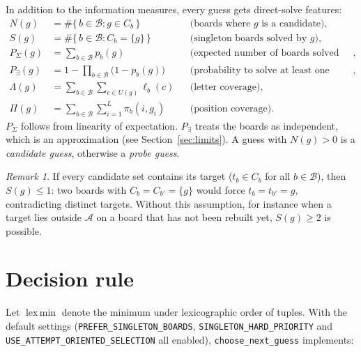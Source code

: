 \documentclass[11pt,a4paper]{article}
\theoremstyle{definition}
\theoremstyle{remark}
\newtheorem*{remark}{Remark}
\newcommand{\A}{\mathcal{A}}
\newcommand{\B}{\mathcal{B}}
\DeclareMathOperator*{\lexmin}{lex\,min}
\begin{document}
In addition to the information measures, every guess gets direct-solve features:
\begin{align*}
  N(g)     &= \#\{\, b \in \B : g \in C_b \,\}
            && \text{(boards where } g \text{ is a candidate)},\\
  S(g)     &= \#\{\, b \in \B : C_b = \{g\} \,\}
            && \text{(singleton boards solved by } g\text{)},\\
  P_{\Sigma}(g) &= \sum_{b \in \B} p_b(g)
            && \text{(expected number of boards solved directly)},\\
  P_{\exists}(g) &= 1 - \prod_{b \in \B} \bigl(1 - p_b(g)\bigr)
            && \text{(probability to solve at least one board)},\\
  \Lambda(g) &= \sum_{b \in \B} \sum_{c \in U(g)} \ell_b(c)
            && \text{(letter coverage)},\\
  \Pi(g)    &= \sum_{b \in \B} \sum_{i=1}^{L} \pi_b(i, g_i)
            && \text{(position coverage)}.
\end{align*}
$P_\Sigma$ follows from linearity of expectation.
$P_\exists$ treats the boards as independent, which is an approximation
(see Section~\ref{sec:limits}).
A guess with $N(g) > 0$ is a \emph{candidate guess}, otherwise a \emph{probe guess}.

\begin{remark}
If every candidate set contains its target ($t_b \in C_b$ for all $b \in \B$), then
$S(g) \le 1$: two boards with $C_b = C_{b'} = \{g\}$ would force $t_b = t_{b'} = g$,
contradicting distinct targets. Without this assumption, for instance when a target lies
outside $\A$ on a board that has not been rebuilt yet, $S(g) \ge 2$ is possible.
\end{remark}

\section{Decision rule}

Let $\lexmin$ denote the minimum under lexicographic order of tuples.
With the default settings (\texttt{PREFER\_SINGLETON\_BOARDS},
\texttt{SINGLETON\_HARD\_PRIORITY} and \texttt{USE\_ATTEMPT\_ORIENTED\_SELECTION} all
enabled), \texttt{choose\_next\_guess} implements:
\end{document}
